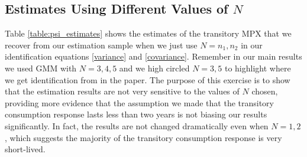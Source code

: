 \documentclass[titlepage]{\econtex}\newcommand{\texname}{ConsumptionHeterogeneity}
\begin{document}
\subsection{Estimates Using Different Values of $N$}
\begin{center}
	\label{table:psi_estimates}
	
\end{center}
Table \ref{table:psi_estimates} shows the estimates of the transitory MPX that we recover from our estimation sample when we just use $N=n_1,n_2$ in our identification equations \ref{variance} and \ref{covariance}. Remember in our main results we used GMM with $N=3,4,5$ and we high circled $N=3,5$ to highlight where we get identification from in the paper. The purpose of this exercise is to show that the estimation results are not very sensitive to the values of $N$ chosen, providing more evidence that the assumption we made that the transitory consumption response lasts less than two years is not biasing our results significantly. In fact, the results are not changed dramatically even when $N=1,2$, which suggests the majority of the transitory consumption response is very short-lived.
\end{document}
